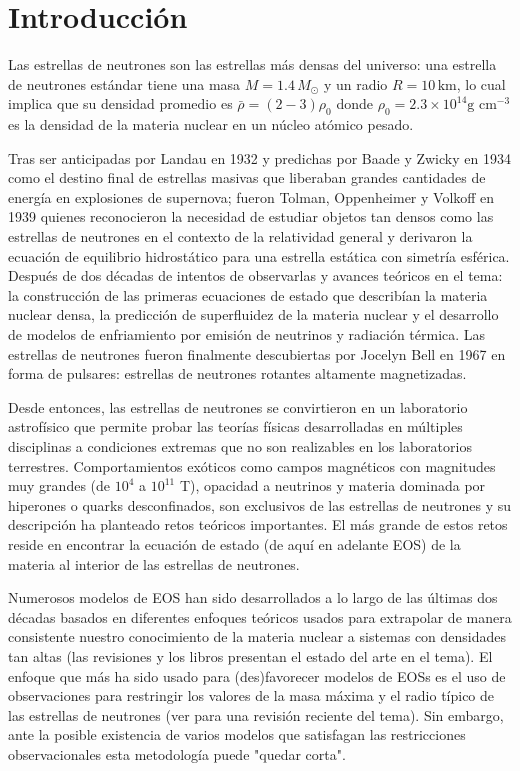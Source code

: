 \chapter*{Introducción}

\noindent Las estrellas de neutrones son las estrellas más densas del universo: una estrella de neutrones estándar tiene una masa $M= 1.4\,M_{\odot}$ y un radio $R=10\,\text{km}$, lo cual implica que su densidad promedio es $\bar{\rho}=(2-3)\rho_0$ donde $\rho_{0}=2.3\times 10^{14} \text{g cm}^{-3}$ es la densidad de la materia nuclear en un núcleo atómico pesado. 

Tras ser anticipadas por Landau en 1932 y predichas por Baade y Zwicky en 1934 como el destino final de estrellas masivas que liberaban grandes cantidades de energía en explosiones de supernova; fueron Tolman, Oppenheimer y Volkoff en 1939 quienes reconocieron la necesidad de estudiar objetos tan densos como las estrellas de neutrones en el contexto de la relatividad general y derivaron la ecuación de equilibrio hidrostático para una estrella estática con simetría esférica. Después de dos décadas de intentos de observarlas y avances teóricos en el tema: la construcción de las primeras ecuaciones de estado que describían la materia nuclear densa, la predicción de superfluidez de la materia nuclear y el desarrollo de modelos de enfriamiento por emisión de neutrinos y radiación térmica. Las estrellas de neutrones fueron finalmente descubiertas por Jocelyn Bell en 1967 en forma de pulsares: estrellas de neutrones rotantes altamente magnetizadas.\protect\footnotemark 
{}

Desde entonces, las estrellas de neutrones se convirtieron en un laboratorio astrofísico que permite probar las teorías físicas desarrolladas en múltiples disciplinas a condiciones extremas que no son realizables en los laboratorios terrestres. Comportamientos exóticos como campos magnéticos con magnitudes muy grandes (de $10^4$ a $10^{11}$ T), opacidad a neutrinos y materia dominada por hiperones o quarks desconfinados, son exclusivos de las estrellas de neutrones y su descripción ha planteado retos teóricos importantes. El más grande de estos retos reside en encontrar la ecuación de estado (de aquí en adelante EOS) de la materia al interior de las estrellas de neutrones. 

Numerosos modelos de EOS han sido desarrollados a lo largo de las últimas dos décadas basados en diferentes enfoques teóricos usados para extrapolar de manera consistente nuestro conocimiento de la materia nuclear a sistemas con densidades tan altas (las revisiones \cite{Ozel2016,Oertel2017} y los libros \cite{Haensel2007,Rezzolla2018} presentan el estado del arte en el tema). El enfoque que más ha sido usado para (des)favorecer modelos de EOSs es el uso de observaciones para restringir los valores de la masa máxima y el radio típico de las estrellas de neutrones (ver \cite{Lattimer2019} para una revisión reciente del tema). Sin embargo, ante la posible existencia de varios modelos que satisfagan las restricciones observacionales esta metodología puede "quedar corta".   

